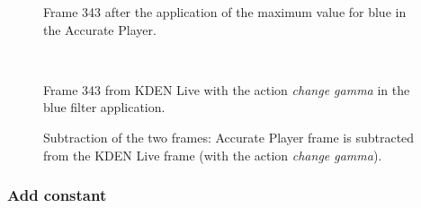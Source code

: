 \documentclass[../MasterThesis.tex]{subfiles}
\begin{document}
\begin{minipage}{0.48\textwidth}
	\begin{figure}[H]
		\begin{center}
			\caption[Frame 343 after the application of the blue filter in the Accurate Player.]{Frame 343 after the application of the maximum value for blue in the Accurate Player.}
		\end{center}
	\end{figure}
\end{minipage}\begin{minipage}{0.04\textwidth}
	\ 
\end{minipage}\begin{minipage}{0.48\textwidth}
	\begin{figure}[H]
		\begin{center}
			\caption[Frame 343 from KDEN Live with the action \textit{change gamma}.]{Frame 343 from KDEN Live with the action \textit{change gamma} in the blue filter application.}
		\end{center}
	\end{figure}
\end{minipage}

\vspace*{-1em}

\begin{figure}[H]
	\begin{center}
		\caption[Subtraction of KDEN Live (\textit{change gamma}) and Accurate Player.]{Subtraction of the two frames: Accurate Player frame is subtracted from the KDEN Live frame (with the action \textit{change gamma}).}
	\end{center}
\end{figure}















\subsubsection*{Add constant}


\vspace*{-1em}
\end{document}
